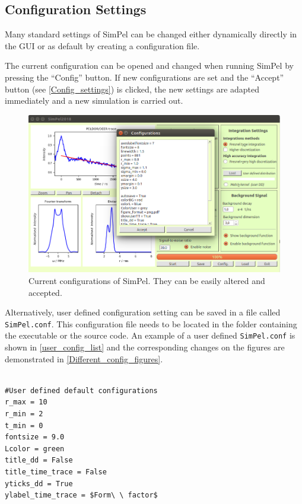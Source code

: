 \documentclass[pdftex,bezier,german,a4,twoside, headexclude,12pt,nochapterprefix, titlepage]{extarticle}
\newcommand{\simpel}{\textsf{SimPel}}
\begin{document}
\clearpage

\subsection{Configuration Settings}

Many standard settings of \simpel{} can be changed either dynamically directly in the GUI or as default by creating a configuration file.

The current configuration can be opened and changed when running  \simpel{} by pressing the ``Config'' button. If new configurations are set and the ``Accept'' button (see \autoref{Config_settings}) is clicked, the new settings are adapted immediately and a new simulation is carried out.

\begin{figure}[!htb]
\centering
\includegraphics[scale=0.5]{Config_example.png}
    \caption{Current configurations of  \simpel. They can be easily altered and accepted.}
   \label{Config_settings}
\end{figure}

Alternatively, user defined configuration setting can be saved in a file called \texttt{SimPel.conf}. This configuration file needs to be located in the folder containing the executable or the source code. An example of a user defined \texttt{SimPel.conf} is shown in \autoref{user_config_list} and the corresponding changes on the figures are demonstrated in \autoref{Different_config_figures}.

\newpage

\begin{lstlisting}[caption={Example for a user defined configuration file (\texttt{SimPel.conf}).},label = user_config_list]

#User defined default configurations 
r_max = 10
r_min = 2
t_min = 0
fontsize = 9.0
Lcolor = green
title_dd = False
title_time_trace = False
yticks_dd = True
ylabel_time_trace = $Form\ \ factor$
\end{lstlisting}
\end{document}

